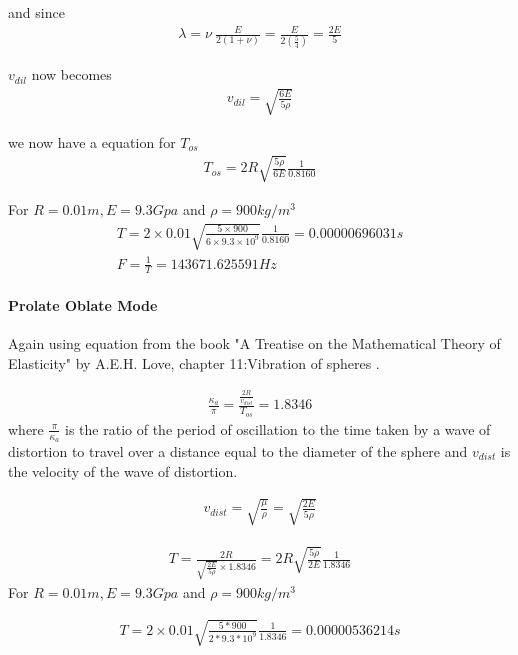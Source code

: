 and since
\begin{align}
\lambda = \nu \ \frac{E}{2(1+\nu)} = \frac{E}{2(\frac{5}{4})} = \frac{2E}{5}
\end{align}

$v_{dil}$ now becomes
\begin{align}
v_{dil} = \sqrt{\frac{6E}{5\rho}}
\end{align}

we now have a equation for $T_{os}$
\begin{align}
T_{os} = 2R \sqrt{\frac{5\rho}{6E}} \frac{1}{0.8160}
\end{align}

For $R=0.01m, E=9.3Gpa$ and $\rho=900kg/m^{3}$
\begin{align}
T = 2\times 0.01 \sqrt{\frac{5 \times 900}{6 \times 9.3\times 10^{9}}} \frac{1}{0.8160} = 0.00000696031s \\
F = \frac{1}{T} = 143671.625591 Hz
\end{align} 


\paragraph{Prolate Oblate Mode}
Again using equation from the book "A Treatise on the Mathematical Theory of Elasticity" by A.E.H. Love, chapter 11:Vibration of spheres \citep{aelove}.

\begin{align}
\frac{\kappa_{a}}{\pi} = \frac{\frac{2R}{v_{dist}}}{T_{os}} = 1.8346
\end{align}
where $\frac{\pi}{\kappa_{a}}$ is the ratio of the period of oscillation to the time taken by a wave of distortion to travel over a distance equal to the diameter of the sphere and $v_{dist}$ is the velocity of the wave of distortion.

\begin{align}
v_{dist} = \sqrt{\frac{\mu}{\rho}} = \sqrt{\frac{2E}{5\rho}}
\end{align}

\begin{align}
T = \frac{2R}{\sqrt{\frac{2E}{5\rho}}\times 1.8346}
= 2R \sqrt{\frac{5\rho}{2E}} \frac{1}{1.8346}
\end{align}
For $R=0.01m, E=9.3Gpa$ and $\rho=900kg/m^{3}$

\begin{align}
T = 2\times 0.01 \sqrt{\frac{5*900}{2*9.3*10^9}} \frac{1}{1.8346} = 0.00000536214s
\end{align} 

